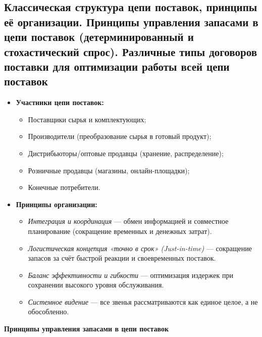 \pagebreak

\subsection{Классическая структура цепи поставок, принципы её организации. Принципы управления запасами в цепи поставок (детерминированный и стохастический спрос). Различные типы договоров поставки для оптимизации работы всей цепи поставок}

\begin{itemize}
    \item \textbf{Участники цепи поставок:}
    \begin{itemize}
        \item Поставщики сырья и комплектующих;
        \item Производители (преобразование сырья в готовый продукт);
        \item Дистрибьюторы/оптовые продавцы (хранение, распределение);
        \item Розничные продавцы (магазины, онлайн-площадки);
        \item Конечные потребители.
    \end{itemize}
    \item \textbf{Принципы организации:}
    \begin{itemize}
        \item \textit{Интеграция и координация} --- обмен информацией и совместное планирование (сокращение временных и денежных затрат).
        \item \textit{Логистическая концепция «точно в срок» (Just-in-time)} --- сокращение запасов за счёт быстрой реакции и своевременных поставок.
        \item \textit{Баланс эффективности и гибкости} --- оптимизация издержек при сохранении высокого уровня обслуживания.
        \item \textit{Системное видение} --- все звенья рассматриваются как единое целое, а не обособленно.
    \end{itemize}
\end{itemize}

\textbf{Принципы управления запасами в цепи поставок}

